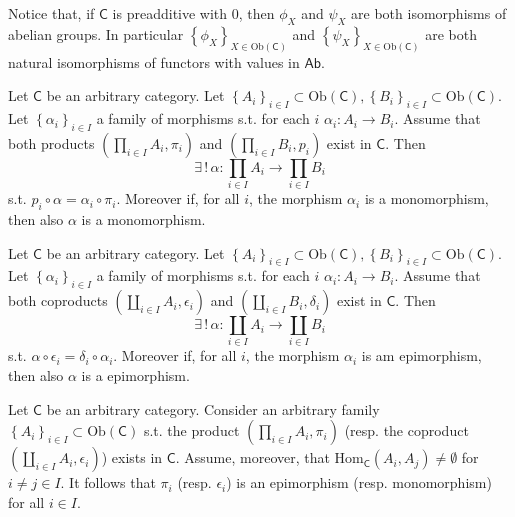 \begin{rem}
	Notice that, if $\mathsf{C}$ is preadditive with $0$,
	then $\phi_X$ and $\psi_X$ are both isomorphisms of abelian groups.
	In particular $\left\{ \phi_X \right\}_{X \in \mathrm{Ob} \left(\mathsf{C}\right)}$ 
	and $\left\{ \psi_X \right\}_{X \in \mathrm{Ob} \left(\mathsf{C}\right)}$ are both natural
	isomorphisms of functors with values in $\mathsf{Ab}$.
\end{rem}

\begin{prop}
	Let $\mathsf{C}$ be an arbitrary category.
	Let $\left\{ A_i \right\}_{i \in I} \subset \mathrm{Ob} \left(\mathsf{C}\right),
	\left\{ B_i \right\}_{i \in I}
	\subset \mathrm{Ob} \left(\mathsf{C}\right)$.
	Let $\left\{ \alpha_i \right\}_{i \in I}$ a family of morphisms s.t. for each $i$ $\alpha_i: A_i \to B_i$.
	Assume that both products $\left(\prod_{i \in I} A_i , \pi_i\right)$ and $\left(\prod_{i \in I} B_i, p_i\right)$ exist in $\mathsf{C}$.
	Then 
	\begin{equation}
	\exists\, !\, \alpha: \prod_{i \in I} A_i  \to \prod_{i \in I} B_i
	\end{equation} 
	s.t. $p_i \circ \alpha = \alpha_i \circ \pi_i$.
	Moreover if, for all $i$, the morphism $\alpha_i$ is a monomorphism,
	then also $\alpha$ is a monomorphism.
\end{prop} 

\begin{prop}
	Let $\mathsf{C}$ be an arbitrary category.
	Let $\left\{ A_i \right\}_{i \in I} \subset \mathrm{Ob} \left(\mathsf{C}\right),
	\left\{ B_i \right\}_{i \in I}
	\subset \mathrm{Ob} \left(\mathsf{C}\right)$.
	Let $\left\{ \alpha_i \right\}_{i \in I}$ a family of morphisms s.t. for each $i$ $\alpha_i: A_i \to B_i$.
	Assume that both coproducts $\left(\coprod_{i \in I} A_i , \epsilon_i\right)$ and
	$\left(\coprod_{i \in I} B_i, \delta_i\right)$ exist in $\mathsf{C}$.
	Then 
	\begin{equation}
	\exists\, !\, \alpha: \coprod_{i \in I} A_i  \to \coprod_{i \in I} B_i
	\end{equation} 
	s.t. $\alpha \circ \epsilon_i = \delta_i \circ \alpha_i$.
	Moreover if, for all $i$, the morphism $\alpha_i$ is am epimorphism,
	then also $\alpha$ is a epimorphism.
\end{prop} 

\begin{prop}
	Let $\mathsf{C}$ be an arbitrary category.
	Consider an arbitrary family $\left\{ A_i \right\}_{i \in I} \subset \mathrm{Ob} \left(\mathsf{C}\right)$ s.t.
	the product $\left(\prod_{i \in I} A_i, \pi_i\right)$ (resp. the coproduct $\left(\coprod_{i \in I} A_i, \epsilon_i \right)$) exists in $\mathsf{C}$.
	Assume, moreover, that $\mathrm{Hom}_{\mathsf{C}} \left( A_i, A_j \right) \neq \emptyset$ for $i \neq j \in I$.
	It follows that $\pi_i$ (resp. $\epsilon_i$) is an epimorphism (resp. monomorphism) for all $i \in I$.
\end{prop} 

